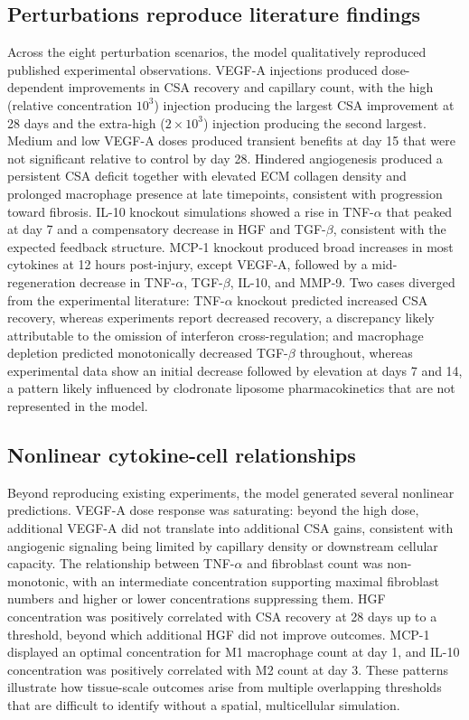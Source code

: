 \documentclass[10pt,letterpaper]{article}
\begin{document}
\subsection{Perturbations reproduce literature findings}

Across the eight perturbation scenarios, the model qualitatively reproduced published experimental observations. VEGF-A injections produced dose-dependent improvements in CSA recovery and capillary count, with the high (relative concentration $10^3$) injection producing the largest CSA improvement at 28 days and the extra-high ($2 \times 10^3$) injection producing the second largest. Medium and low VEGF-A doses produced transient benefits at day 15 that were not significant relative to control by day 28. Hindered angiogenesis produced a persistent CSA deficit together with elevated ECM collagen density and prolonged macrophage presence at late timepoints, consistent with progression toward fibrosis. IL-10 knockout simulations showed a rise in TNF-$\alpha$ that peaked at day 7 and a compensatory decrease in HGF and TGF-$\beta$, consistent with the expected feedback structure. MCP-1 knockout produced broad increases in most cytokines at 12 hours post-injury, except VEGF-A, followed by a mid-regeneration decrease in TNF-$\alpha$, TGF-$\beta$, IL-10, and MMP-9. Two cases diverged from the experimental literature: TNF-$\alpha$ knockout predicted increased CSA recovery, whereas experiments report decreased recovery, a discrepancy likely attributable to the omission of interferon cross-regulation; and macrophage depletion predicted monotonically decreased TGF-$\beta$ throughout, whereas experimental data show an initial decrease followed by elevation at days 7 and 14, a pattern likely influenced by clodronate liposome pharmacokinetics that are not represented in the model.

\subsection{Nonlinear cytokine-cell relationships}

Beyond reproducing existing experiments, the model generated several nonlinear predictions. VEGF-A dose response was saturating: beyond the high dose, additional VEGF-A did not translate into additional CSA gains, consistent with angiogenic signaling being limited by capillary density or downstream cellular capacity. The relationship between TNF-$\alpha$ and fibroblast count was non-monotonic, with an intermediate concentration supporting maximal fibroblast numbers and higher or lower concentrations suppressing them. HGF concentration was positively correlated with CSA recovery at 28 days up to a threshold, beyond which additional HGF did not improve outcomes. MCP-1 displayed an optimal concentration for M1 macrophage count at day 1, and IL-10 concentration was positively correlated with M2 count at day 3. These patterns illustrate how tissue-scale outcomes arise from multiple overlapping thresholds that are difficult to identify without a spatial, multicellular simulation.
\end{document}
